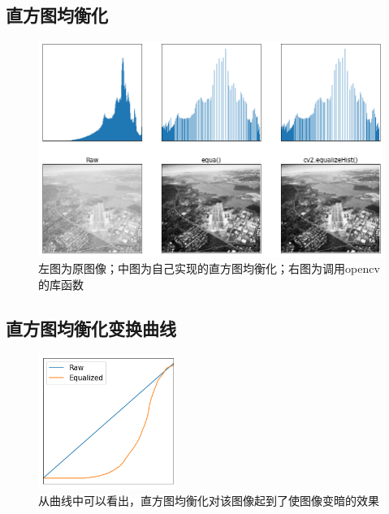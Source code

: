 \documentclass[a4paper]{ctexart}
\begin{document}
  \subsection*{直方图均衡化}
  \begin{figure}[H]
    \includegraphics*[width=1.0\textwidth]{fig/equagray.png}
    \caption{左图为原图像；中图为自己实现的直方图均衡化；右图为调用opencv的库函数}
  \end{figure}

  \subsection*{直方图均衡化变换曲线}
  \begin{figure}[H]
    \centering \includegraphics*[width=0.4\textwidth]{fig/equacurve.png}
    \caption{从曲线中可以看出，直方图均衡化对该图像起到了使图像变暗的效果}
  \end{figure}
\end{document}
